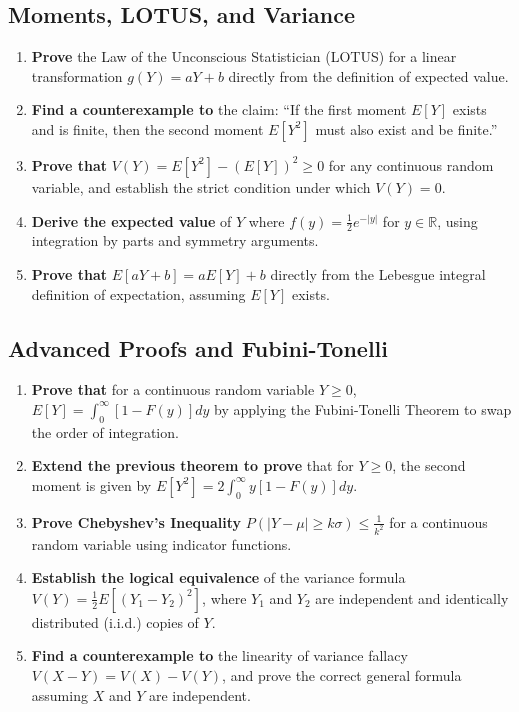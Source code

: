 \documentclass[11pt, a4paper]{article}
\theoremstyle{definition}
\theoremstyle{remark}
\newcommand{\R}{\mathbb{R}}
\begin{document}
\subsection{Moments, LOTUS, and Variance}
\begin{enumerate}[label=\textbf{\arabic*.}, resume]
    \item \textbf{Prove} the Law of the Unconscious Statistician (LOTUS) for a linear transformation $g(Y) = aY + b$ directly from the definition of expected value.
    \item \textbf{Find a counterexample to} the claim: ``If the first moment $E[Y]$ exists and is finite, then the second moment $E[Y^2]$ must also exist and be finite.''
    \item \textbf{Prove that} $V(Y) = E[Y^2] - (E[Y])^2 \ge 0$ for any continuous random variable, and establish the strict condition under which $V(Y) = 0$.
    \item \textbf{Derive the expected value} of $Y$ where $f(y) = \frac{1}{2} e^{-|y|}$ for $y \in \R$, using integration by parts and symmetry arguments.
    \item \textbf{Prove that} $E[aY+b] = aE[Y]+b$ directly from the Lebesgue integral definition of expectation, assuming $E[Y]$ exists.
\end{enumerate}

\subsection{Advanced Proofs and Fubini-Tonelli}
\begin{enumerate}[label=\textbf{\arabic*.}, resume]
    \item \textbf{Prove that} for a continuous random variable $Y \ge 0$, $E[Y] = \int_0^\infty [1-F(y)] dy$ by applying the Fubini-Tonelli Theorem to swap the order of integration.
    \item \textbf{Extend the previous theorem to prove} that for $Y \ge 0$, the second moment is given by $E[Y^2] = 2 \int_0^\infty y[1-F(y)] dy$.
    \item \textbf{Prove Chebyshev's Inequality} $P(|Y-\mu| \ge k\sigma) \le \frac{1}{k^2}$ for a continuous random variable using indicator functions.
    \item \textbf{Establish the logical equivalence} of the variance formula $V(Y) = \frac{1}{2} E[(Y_1 - Y_2)^2]$, where $Y_1$ and $Y_2$ are independent and identically distributed (i.i.d.) copies of $Y$.
    \item \textbf{Find a counterexample to} the linearity of variance fallacy $V(X-Y) = V(X) - V(Y)$, and prove the correct general formula assuming $X$ and $Y$ are independent.
\end{enumerate}
\end{document}
